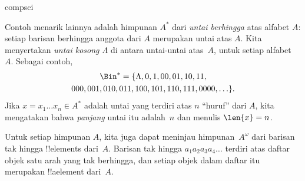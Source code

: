 \documentclass[../../../include/open-logic-section]{subfiles}
\begin{document}
\begin{tagblock}{compsci}
\begin{ex}[Untai]
Contoh menarik lainnya adalah himpunan $A^{*}$ dari \emph{untai
berhingga} atas alfabet $A$: setiap barisan berhingga anggota dari
$A$ merupakan untai atas $A$. Kita menyertakan \emph{untai kosong
$\Lambda$} di antara untai-untai atas~$A$, untuk setiap alfabet~$A$.
Sebagai contoh,
\begin{multline*}
\Bin^*
=\{\Lambda,0,1,00,01,10,11,\\
000,001,010,011,100,101,110,111,0000,\ldots\}.
\end{multline*}
Jika $x=x_{1}\ldots x_{n}\in A^{*}$ adalah untai yang terdiri atas $n$
``huruf'' dari $A$, kita mengatakan bahwa \emph{panjang} untai itu
adalah~$n$ dan menulis $\len{x}=n$.
\end{ex}
\end{tagblock}

\begin{ex}
Untuk setiap himpunan $A$, kita juga dapat meninjau himpunan~$A^\omega$
dari barisan tak hingga !!{element}s dari~$A$. Barisan tak hingga
$a_1a_2a_3a_4\dots$ terdiri atas daftar objek satu arah yang tak
berhingga, dan setiap objek dalam daftar itu merupakan !!a{element}
dari~$A$.
\end{ex}
\end{document}

